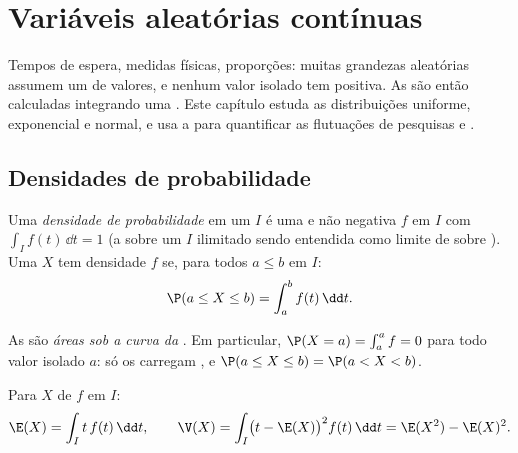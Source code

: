 \chapter{Variáveis aleatórias contínuas}\label{ch:g12:contdist}

Tempos de espera, medidas físicas, proporções: muitas grandezas aleatórias
assumem um  de valores, e nenhum valor isolado tem 
positiva. As  são então calculadas integrando uma
\emph{}. Este capítulo estuda as distribuições uniforme,
exponencial e normal, e usa a  para quantificar as flutuações de
pesquisas e .

\section{Densidades de probabilidade}

\begin{definition}\label{def:g12:contdist:density}
Uma \emph{densidade de probabilidade} em um  $I$
é uma   e não negativa $f$ em $I$ com
$\int_I f(t)\,\dd t = 1$ (a  sobre um $I$ ilimitado sendo
entendida como limite de  sobre  
). Uma  $X$ tem densidade $f$ se, para todos
$a \leq b$ em $I$:
\[
\P(a \leq X \leq b) = \int_a^b f(t)\,\dd t .
\]
\end{definition}

As  são \emph{áreas sob a curva da }. Em
particular, $\P(X = a) = \int_a^a f = 0$ para todo valor isolado $a$: só
os  carregam , e
$\P(a \leq X \leq b) = \P(a < X < b)$.

\begin{definition}\label{def:g12:contdist:exp}
Para $X$ de  $f$ em $I$:
\[
\E(X) = \int_I t\,f(t)\,\dd t, \qquad
\V(X) = \int_I \bigl(t - \E(X)\bigr)^2 f(t)\,\dd t
= \E(X^2) - \E(X)^2 .
\]
\end{definition}

